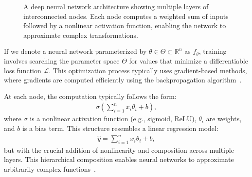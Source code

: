 \begin{figure}[H]
  \caption{A deep neural network architecture showing multiple layers of interconnected nodes. Each node computes a weighted sum of inputs followed by a nonlinear activation function, enabling the network to approximate complex transformations.}
  \label{fig:deep_nn}
\end{figure}

If we denote a neural network parameterized by $\theta \in \Theta \subset \mathbb{R}^n$ as $f_\theta$, training involves searching the parameter space $\Theta$ for values that minimize a differentiable loss function $\mathcal{L}$. This optimization process typically uses gradient-based methods, where gradients are computed efficiently using the backpropagation algorithm~\cite{ref:rumelhart-1986}.

At each node, the computation typically follows the form:
\begin{align}
\sigma\left(\sum_{i=1}^n x_i\theta_i + b\right),
\end{align}
where $\sigma$ is a nonlinear activation function (e.g., sigmoid, ReLU), $\theta_i$ are weights, and $b$ is a bias term. This structure resembles a linear regression model:
\begin{align}
  \label{eq:lin-reg} \hat{y} = \sum_{i=1}^n x_i\theta_i + b,
\end{align}
but with the crucial addition of nonlinearity and composition across multiple layers. This hierarchical composition enables neural networks to approximate arbitrarily complex functions~\cite{ref:cheng-2018}.

